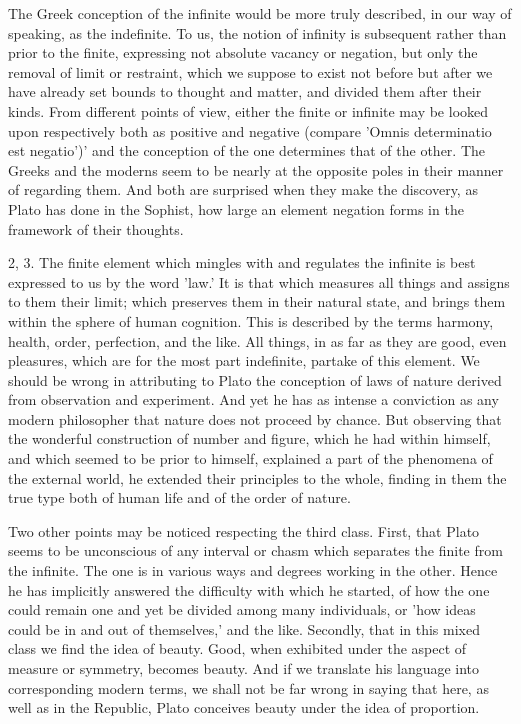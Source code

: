 \documentclass[11pt,letter]{article}
\begin{document}
\par  The Greek conception of the infinite would be more truly described, in our way of speaking, as the indefinite. To us, the notion of infinity is subsequent rather than prior to the finite, expressing not absolute vacancy or negation, but only the removal of limit or restraint, which we suppose to exist not before but after we have already set bounds to thought and matter, and divided them after their kinds. From different points of view, either the finite or infinite may be looked upon respectively both as positive and negative (compare 'Omnis determinatio est negatio')' and the conception of the one determines that of the other. The Greeks and the moderns seem to be nearly at the opposite poles in their manner of regarding them. And both are surprised when they make the discovery, as Plato has done in the Sophist, how large an element negation forms in the framework of their thoughts.

\par  2, 3. The finite element which mingles with and regulates the infinite is best expressed to us by the word 'law.' It is that which measures all things and assigns to them their limit; which preserves them in their natural state, and brings them within the sphere of human cognition. This is described by the terms harmony, health, order, perfection, and the like. All things, in as far as they are good, even pleasures, which are for the most part indefinite, partake of this element. We should be wrong in attributing to Plato the conception of laws of nature derived from observation and experiment. And yet he has as intense a conviction as any modern philosopher that nature does not proceed by chance. But observing that the wonderful construction of number and figure, which he had within himself, and which seemed to be prior to himself, explained a part of the phenomena of the external world, he extended their principles to the whole, finding in them the true type both of human life and of the order of nature.

\par  Two other points may be noticed respecting the third class. First, that Plato seems to be unconscious of any interval or chasm which separates the finite from the infinite. The one is in various ways and degrees working in the other. Hence he has implicitly answered the difficulty with which he started, of how the one could remain one and yet be divided among many individuals, or 'how ideas could be in and out of themselves,' and the like. Secondly, that in this mixed class we find the idea of beauty. Good, when exhibited under the aspect of measure or symmetry, becomes beauty. And if we translate his language into corresponding modern terms, we shall not be far wrong in saying that here, as well as in the Republic, Plato conceives beauty under the idea of proportion.
\end{document}
